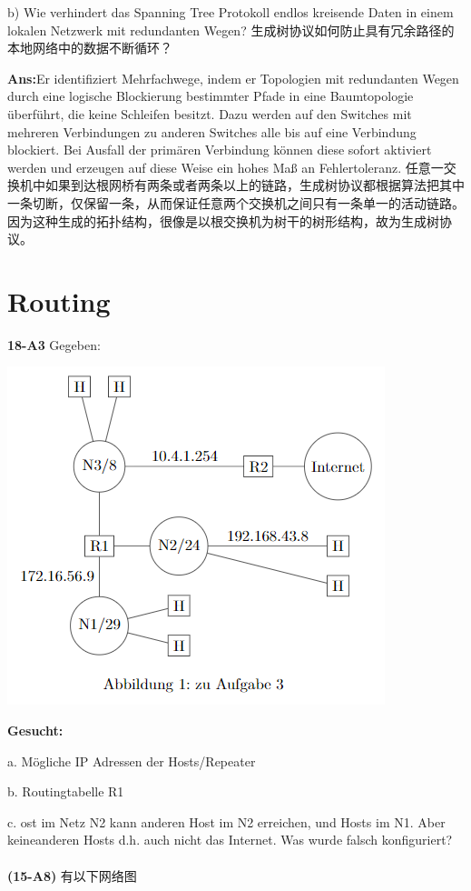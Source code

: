 \documentclass[fleqn]{article}
\begin{document}
b) Wie verhindert das Spanning Tree Protokoll endlos kreisende Daten in einem lokalen Netzwerk mit redundanten Wegen?
生成树协议如何防止具有冗余路径的本地网络中的数据不断循环？

\textbf{Ans:}Er identifiziert Mehrfachwege, indem er Topologien mit redundanten Wegen durch eine logische Blockierung bestimmter Pfade in eine Baumtopologie überführt, die keine Schleifen besitzt. Dazu werden auf den Switches mit mehreren Verbindungen zu anderen Switches alle bis auf eine Verbindung blockiert. Bei Ausfall der primären Verbindung können diese sofort aktiviert werden und erzeugen auf diese Weise ein hohes Maß an Fehlertoleranz.
任意一交换机中如果到达根网桥有两条或者两条以上的链路，生成树协议都根据算法把其中一条切断，仅保留一条，从而保证任意两个交换机之间只有一条单一的活动链路。因为这种生成的拓扑结构，很像是以根交换机为树干的树形结构，故为生成树协议。

\clearpage

\section{Routing}

\noindent\textbf{18-A3} Gegeben: 
\begin{center}
    \includegraphics[scale=0.5]{bild1.png}
\end{center}


\textbf{Gesucht:}

a. Mögliche IP Adressen der Hosts/Repeater

b. Routingtabelle R1

c. ost im Netz N2 kann anderen Host im N2 erreichen, und Hosts im N1. Aber keineanderen Hosts d.h. auch nicht das Internet. Was wurde falsch konfiguriert?
\\
\\
\noindent\textbf{(15-A8)} 有以下网络图
\end{document}
